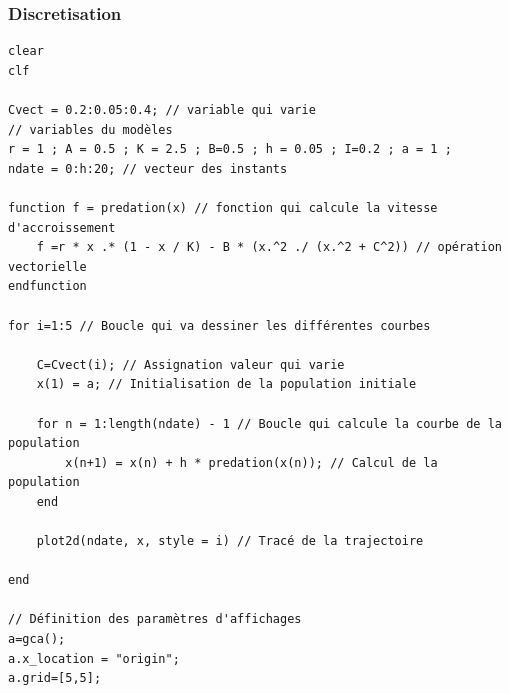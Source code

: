 \documentclass{article}
\begin{document}
\subsubsection{Discretisation}

\begin{verbatim}
clear
clf

Cvect = 0.2:0.05:0.4; // variable qui varie
// variables du modèles
r = 1 ; A = 0.5 ; K = 2.5 ; B=0.5 ; h = 0.05 ; I=0.2 ; a = 1 ;
ndate = 0:h:20; // vecteur des instants

function f = predation(x) // fonction qui calcule la vitesse d'accroissement
    f =r * x .* (1 - x / K) - B * (x.^2 ./ (x.^2 + C^2)) // opération vectorielle
endfunction

for i=1:5 // Boucle qui va dessiner les différentes courbes
    
    C=Cvect(i); // Assignation valeur qui varie
    x(1) = a; // Initialisation de la population initiale
    
    for n = 1:length(ndate) - 1 // Boucle qui calcule la courbe de la population
        x(n+1) = x(n) + h * predation(x(n)); // Calcul de la population
    end
    
    plot2d(ndate, x, style = i) // Tracé de la trajectoire

end

// Définition des paramètres d'affichages
a=gca();
a.x_location = "origin";
a.grid=[5,5];
\end{verbatim}
\end{document}
